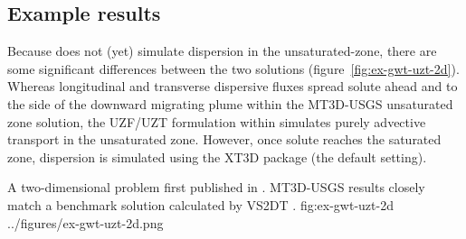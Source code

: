 \subsection{Example results}

Because \mf does not (yet) simulate dispersion in the unsaturated-zone, there are some significant differences between the two solutions (figure~\ref{fig:ex-gwt-uzt-2d}).  Whereas longitudinal and transverse dispersive fluxes spread solute ahead and to the side of the downward migrating plume within the MT3D-USGS unsaturated zone solution, the UZF/UZT formulation within \mf simulates purely advective transport in the unsaturated zone.  However, once solute reaches the saturated zone, dispersion is simulated using the XT3D package (the default setting).  

\begin{StandardFigure}
	{A two-dimensional problem first published in \cite{morway2013}.  MT3D-USGS results closely match a benchmark solution calculated by VS2DT \citep{lappalaetal1987VS2D}.}
	{fig:ex-gwt-uzt-2d}
	{../figures/ex-gwt-uzt-2d.png}
\end{StandardFigure}
